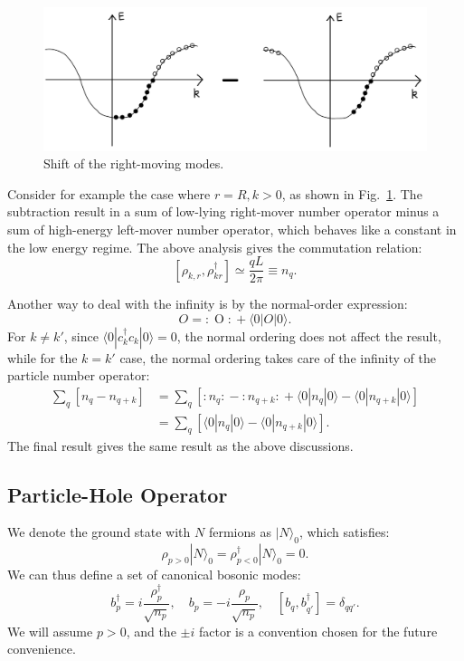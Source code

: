 \documentclass[aps,prb,superscriptaddress,nofootinbib]{revtex4}
\begin{document}
\begin{figure}
	\includegraphics[hsmash=c,width=0.5\linewidth]{pics/LL-k-shift}
	\caption{Shift of the right-moving modes.}
	\label{fig:bs-k-shift}
\end{figure}

Consider for example the case where $r=R,k>0$, as shown in Fig.~\ref{fig:bs-k-shift}.
The subtraction result in a sum of low-lying right-mover number operator minus a sum of high-energy left-mover number operator, which behaves like a constant in the low energy regime. 
The above analysis gives the commutation relation:
\begin{equation}
	\left[\rho_{k,r}, \rho_{kr}^\dagger \right] \simeq \frac{qL}{2\pi} \equiv n_q.
\end{equation}

Another way to deal with the infinity is by the normal-order expression:
\begin{equation}
	O = {:\mathrel{O}:} + \langle 0|O|0\rangle.
\end{equation}
For $k\ne k'$, since $\langle 0|c_k^\dagger c_k|0\rangle=0$, the normal ordering does not affect the result, while for the $k=k'$ case, the normal ordering takes care of the infinity of the particle number operator:
\begin{equation}
\begin{aligned}
	\sum_q [n_{q} - n_{q+k}]
	&= \sum_q \left[{:\mathrel{n_{q}}:} - {:\mathrel{n_{q+k}}:} 
		+ \langle0|n_{q}|0\rangle -\langle0|n_{q+k}|0\rangle \right] \\
	&= \sum_q [\langle0|n_{q}|0\rangle -\langle0|n_{q+k}|0\rangle].
\end{aligned}
\end{equation}
The final result gives the same result as the above discussions.

\subsection{Particle-Hole Operator}
We denote the ground state with $N$ fermions as $|N\rangle_0$, which satisfies:
\begin{equation}
	\rho_{p>0}|N\rangle_0 = \rho^\dagger_{p<0}|N\rangle_0 = 0.
\end{equation}
We can thus define a set of canonical bosonic modes:
\begin{equation}
	b_p^\dagger = i\frac{\rho^\dagger_p}{\sqrt{n_p}}, \quad 
	b_p = -i\frac{\rho_p}{\sqrt{n_p}}, \quad [b_q,b_{q'}^\dagger] = \delta_{qq'}.
\end{equation}
We will assume $p>0$, and the $\pm i$ factor is a convention chosen for the future convenience.
\end{document}
